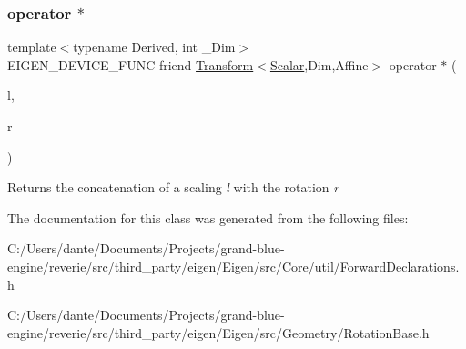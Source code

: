 \subsubsection{\texorpdfstring{operator $\ast$}{operator *}\hspace{0.1cm}{\footnotesize\ttfamily [2/2]}}
{\footnotesize\ttfamily template$<$typename Derived, int \+\_\+\+Dim$>$ \\
E\+I\+G\+E\+N\+\_\+\+D\+E\+V\+I\+C\+E\+\_\+\+F\+U\+NC friend \mbox{\hyperlink{class_eigen_1_1_transform}{Transform}}$<$\mbox{\hyperlink{class_eigen_1_1_rotation_base_af9b43eac462d7aa70b018efd49c13ef4}{Scalar}},Dim,Affine$>$ operator $\ast$ (\begin{DoxyParamCaption}\item[{const \mbox{\hyperlink{class_eigen_1_1_diagonal_matrix}{Diagonal\+Matrix}}$<$ \mbox{\hyperlink{class_eigen_1_1_rotation_base_af9b43eac462d7aa70b018efd49c13ef4}{Scalar}}, Dim $>$ \&}]{l,  }\item[{const Derived \&}]{r }\end{DoxyParamCaption})\hspace{0.3cm}{\ttfamily [friend]}}

\begin{DoxyReturn}{Returns}
the concatenation of a scaling {\itshape l} with the rotation {\itshape r} 
\end{DoxyReturn}


The documentation for this class was generated from the following files\+:\begin{DoxyCompactItemize}
\item 
C\+:/\+Users/dante/\+Documents/\+Projects/grand-\/blue-\/engine/reverie/src/third\+\_\+party/eigen/\+Eigen/src/\+Core/util/Forward\+Declarations.\+h\item 
C\+:/\+Users/dante/\+Documents/\+Projects/grand-\/blue-\/engine/reverie/src/third\+\_\+party/eigen/\+Eigen/src/\+Geometry/Rotation\+Base.\+h\end{DoxyCompactItemize}
